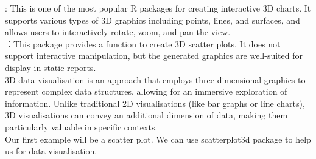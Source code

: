 \documentclass{article}\usepackage[]{graphicx}\usepackage[]{xcolor}
\begin{document}
\noindent
{}: This is one of the most popular R packages for creating interactive 3D charts. It supports various types of 3D graphics including points, lines, and surfaces, and allows users to interactively rotate, zoom, and pan the view.\\
：This package provides a function to create 3D scatter plots. It does not support interactive manipulation, but the generated graphics are well-suited for display in static reports.\\

\noindent
3D data visualisation is an approach that employs three-dimensional graphics to represent complex data structures, allowing for an immersive exploration of information. Unlike traditional 2D visualisations (like bar graphs or line charts), 3D visualisations can convey an additional dimension of data, making them particularly valuable in specific contexts.\\

\noindent
Our first example will be  a scatter plot. We can use scatterplot3d package to help us for data visualisation.
\end{document}
